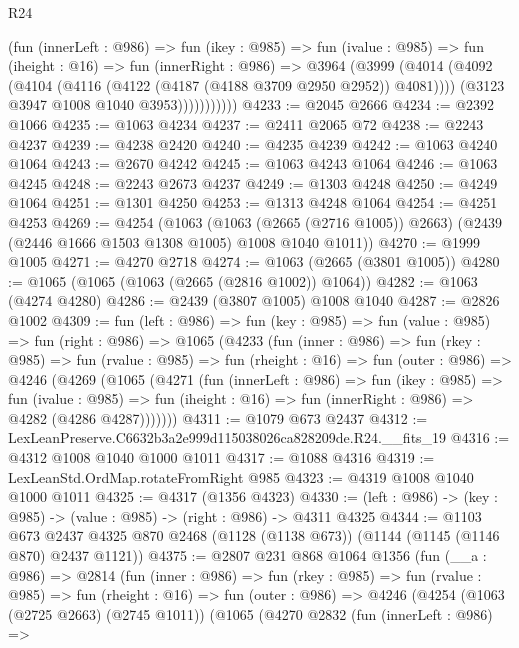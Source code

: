 \begin{lexlean}{R24}
\begin{coremodule}
                  (fun (innerLeft : @986) =>
                  fun (ikey : @985) =>
                  fun (ivalue : @985) =>
                  fun (iheight : @16) =>
                  fun (innerRight : @986) =>
                  @3964
                    (@3999
                      (@4014
                        (@4092 (@4104 (@4116 (@4122 (@4187 (@4188 @3709 @2950 @2952)) @4081))))
                        (@3123 @3947 @1008 @1040 @3953)))))))))))
@4233 := @2045 @2666
@4234 := @2392 @1066
@4235 := @1063 @4234
@4237 := @2411 @2065 @72
@4238 := @2243 @4237
@4239 := @4238 @2420
@4240 := @4235 @4239
@4242 := @1063 @4240 @1064
@4243 := @2670 @4242
@4245 := @1063 @4243 @1064
@4246 := @1063 @4245
@4248 := @2243 @2673 @4237
@4249 := @1303 @4248
@4250 := @4249 @1064
@4251 := @1301 @4250
@4253 := @1313 @4248 @1064
@4254 := @4251 @4253
@4269 := @4254
    (@1063
      (@1063 (@2665 (@2716 @1005)) @2663)
      (@2439 (@2446 @1666 @1503 @1308 @1005) @1008 @1040 @1011))
@4270 := @1999 @1005
@4271 := @4270 @2718
@4274 := @1063 (@2665 (@3801 @1005))
@4280 := @1065 (@1065 (@1063 (@2665 (@2816 @1002)) @1064))
@4282 := @1063 (@4274 @4280)
@4286 := @2439 (@3807 @1005) @1008 @1040
@4287 := @2826 @1002
@4309 := fun (left : @986) =>
  fun (key : @985) =>
  fun (value : @985) =>
  fun (right : @986) =>
  @1065
    (@4233
      (fun (inner : @986) =>
      fun (rkey : @985) =>
      fun (rvalue : @985) =>
      fun (rheight : @16) =>
      fun (outer : @986) =>
      @4246
        (@4269
          (@1065
            (@4271
              (fun (innerLeft : @986) =>
              fun (ikey : @985) =>
              fun (ivalue : @985) =>
              fun (iheight : @16) => fun (innerRight : @986) => @4282 (@4286 @4287)))))))
@4311 := @1079 @673 @2437
@4312 := LexLeanPreserve.C6632b3a2e999d115038026ca828209de.R24.__fits_19
@4316 := @4312 @1008 @1040 @1000 @1011
@4317 := @1088 @4316
@4319 := LexLeanStd.OrdMap.rotateFromRight @985
@4323 := @4319 @1008 @1040 @1000 @1011
@4325 := @4317 (@1356 @4323)
@4330 := (left : @986) -> (key : @985) -> (value : @985) -> (right : @986) -> @4311 @4325
@4344 := @1103
    @673
    @2437
    @4325
    @870
    @2468
    (@1128 (@1138 @673))
    (@1144 (@1145 (@1146 @870) @2437 @1121))
@4375 := @2807
    @231
    @868
    @1064
    @1356
    (fun (__a : @986) =>
    @2814
      (fun (inner : @986) =>
      fun (rkey : @985) =>
      fun (rvalue : @985) =>
      fun (rheight : @16) =>
      fun (outer : @986) =>
      @4246
        (@4254
          (@1063 (@2725 @2663) (@2745 @1011))
          (@1065
            (@4270
              @2832
              (fun (innerLeft : @986) =>

\end{coremodule}
\end{lexlean}
